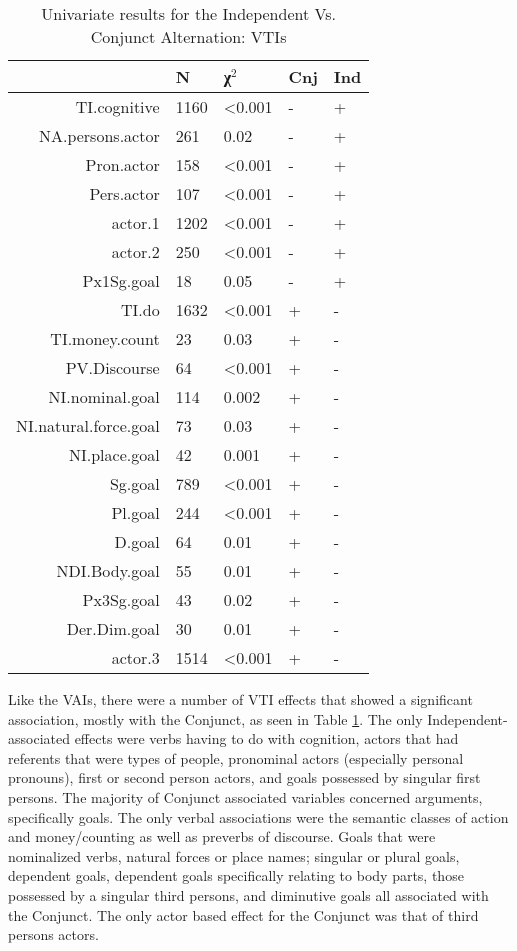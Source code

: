 \begin{table}[H]
  \centering
  \footnotesize
\begin{tabular}{rllll}
    \toprule
 & N & χ$^{2}$ & Cnj & Ind \\ 
\midrule
TI.cognitive & 1160 & \textless{}0.001 & - & + \\

NA.persons.actor & 261 & 0.02 & - & + \\
Pron.actor & 158 & \textless{}0.001 & - & + \\
Pers.actor & 107 & \textless{}0.001 & - & + \\
actor.1 & 1202 & \textless{}0.001 & - & + \\
actor.2 & 250 & \textless{}0.001 & - & + \\
Px1Sg.goal & 18 & 0.05 & - & + \\


TI.do & 1632 & \textless{}0.001 & + & - \\
TI.money.count & 23 & 0.03 & + & - \\
PV.Discourse & 64 & \textless{}0.001 & + & - \\
NI.nominal.goal & 114 & 0.002 & + & - \\
NI.natural.force.goal & 73 & 0.03 & + & - \\
NI.place.goal & 42 & 0.001 & + & - \\
Sg.goal & 789 & \textless{}0.001 & + & - \\
Pl.goal & 244 & \textless{}0.001 & + & - \\

D.goal & 64 & 0.01 & + & - \\
NDI.Body.goal & 55 & 0.01 & + & - \\
Px3Sg.goal & 43 & 0.02 & + & - \\
Der.Dim.goal & 30 & 0.01 & + & - \\
actor.3 & 1514 & \textless{}0.001 & + & - \\


  \bottomrule
  \end{tabular}
  \caption{
   Univariate results for the Independent Vs. Conjunct Alternation: VTIs \\ \label{tab:tincnjuni}
  }
\end{table}

Like the VAIs, there were a number of VTI effects that showed a significant association, mostly with the Conjunct, as seen in Table \ref{tab:tincnjuni}. The only Independent-associated effects were verbs having to do with cognition, actors that had referents that were types of people, pronominal actors (especially personal pronouns), first or second person actors, and goals possessed by singular first persons. The majority of Conjunct associated variables concerned arguments, specifically goals. The only verbal associations were the semantic classes of action and money/counting as well as preverbs of discourse. Goals that were nominalized verbs, natural forces or place names; singular or plural goals, dependent goals, dependent goals specifically relating to body parts, those possessed by a singular third persons, and diminutive goals all associated with the Conjunct. The only actor based effect for the Conjunct was that of third persons actors. 
\FloatBarrier

